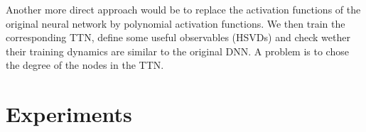 \documentclass{article}
\theoremstyle{definition}
\begin{document}
Another more direct approach would be to replace the activation functions of the original neural network by polynomial activation functions. We then train the corresponding TTN, define some useful observables (HSVDs) and check wether their training dynamics are similar to the original DNN. A problem is to chose the degree of the nodes in the TTN. 
\section{Experiments}
\end{document}
